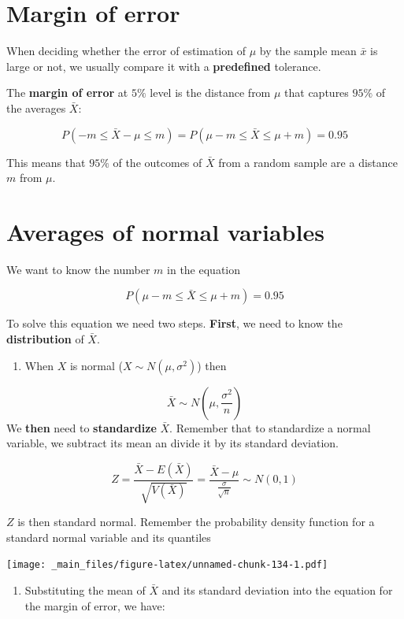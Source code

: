 \documentclass[
]{book}
\providecommand{\tightlist}{%
  \setlength{\itemsep}{0pt}\setlength{\parskip}{0pt}}
\begin{document}
\hypertarget{margin-of-error}{%
\section{Margin of error}\label{margin-of-error}}

When deciding whether the error of estimation of \(\mu\) by the sample mean \(\bar{x}\) is large or not, we usually compare it with a \textbf{predefined} tolerance.

The \textbf{margin of error} at \(5\%\) level is the distance from \(\mu\) that captures \(95\%\) of the averages \(\bar{X}\):

\[P(-m \leq \bar{X}-\mu \leq m)=P(\mu-m \leq \bar{X} \leq\mu + m)=0.95\]

This means that \(95\%\) of the outcomes of \(\bar{X}\) from a random sample are a distance \(m\) from \(\mu\).

\hypertarget{averages-of-normal-variables}{%
\section{Averages of normal variables}\label{averages-of-normal-variables}}

We want to know the number \(m\) in the equation

\[P(\mu-m \leq \bar{X} \leq\mu + m)=0.95\]

To solve this equation we need two steps. \textbf{First}, we need to know the \textbf{distribution} of \(\bar{X}\).

\begin{enumerate}
\def\labelenumi{\arabic{enumi}.}
\tightlist
\item
  When \(X\) is normal (\(X \sim N(\mu, \sigma^2)\)) then
\end{enumerate}

\[\bar{X} \sim N(\mu, \frac{\sigma^2}{n})\]
We \textbf{then} need to \textbf{standardize} \(\bar{X}\). Remember that to standardize a normal variable, we subtract its mean an divide it by its standard deviation.

\[Z=\frac{\bar{X}-E(\bar{X})}{\sqrt{V(\bar{X})}} =\frac{\bar{X}-\mu}{\frac{\sigma}{\sqrt{n}}}  \sim N(0,1)\]

\(Z\) is then standard normal. Remember the probability density function for a standard normal variable and its quantiles

\texttt{[image: \_main\_files/figure-latex/unnamed-chunk-134-1.pdf]}

\begin{enumerate}
\def\labelenumi{\arabic{enumi}.}
\setcounter{enumi}{1}
\tightlist
\item
  Substituting the mean of \(\bar{X}\) and its standard deviation into the equation for the margin of error, we have:
\end{enumerate}
\end{document}
